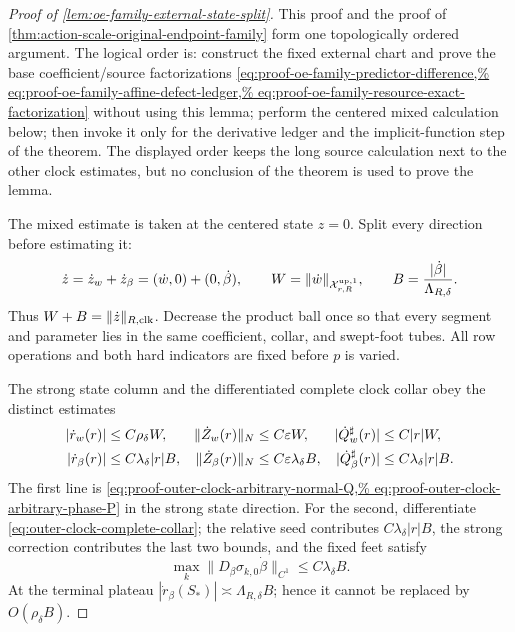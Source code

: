 \begin{proof}[Proof of
\cref{lem:oe-family-external-state-split}]
This proof and the proof of
\cref{thm:action-scale-original-endpoint-family} form one topologically
ordered argument.  The logical order is: construct the fixed external
chart and prove the base coefficient/source factorizations
\cref{eq:proof-oe-family-predictor-difference,%
eq:proof-oe-family-affine-defect-ledger,%
eq:proof-oe-family-resource-exact-factorization} without using this
lemma; perform the centered mixed calculation below; then invoke it only
for the derivative ledger and the implicit-function step of the theorem.
The displayed order keeps the long source calculation next to the other
clock estimates, but no conclusion of the theorem is used to prove the
lemma.

The mixed estimate is taken at the centered state \(z=0\).  Split every
direction before estimating it:
\begin{equation}
 \dot z=\dot z_w+\dot z_\beta=(\dot w,0)+(0,\dot\beta),
 \qquad
 W=\|\dot w\|_{\mathcal X_{r,R}^{\rm up,1}},
 \qquad
 B=\frac{|\dot\beta|}{\Lambda_{R,\delta}}.       \label{eq:proof-oe-family-direction-split}
\end{equation}
Thus \(W+B=\|\dot z\|_{R,\rm clk}\).  Decrease the product ball once so
that every segment and parameter lies in the same coefficient, collar,
and swept-foot tubes.  All row operations and both hard indicators are
fixed before \(p\) is varied.

The strong state column and the differentiated complete clock collar obey
the distinct estimates
\begin{align}
 |\dot r_w(r)|&\le C\rho_\delta W,&
 \|\dot Z_w(r)\|_N&\le C\varepsilon W,&
 |\dot Q_w^\sharp(r)|&\le C|r|W,\notag\\
 |\dot r_\beta(r)|&\le C\lambda_\delta|r|B,&
 \|\dot Z_\beta(r)\|_N&\le C\varepsilon\lambda_\delta B,&
 |\dot Q_\beta^\sharp(r)|&\le C\lambda_\delta|r|B.
                                                        \label{eq:proof-oe-family-state-clock-columns}
\end{align}
The first line is
\cref{eq:proof-outer-clock-arbitrary-normal-Q,%
eq:proof-outer-clock-arbitrary-phase-P} in the strong state direction.
For the second, differentiate
\cref{eq:outer-clock-complete-collar}; the relative seed contributes
\(C\lambda_\delta|r|B\), the strong correction contributes the last two
bounds, and the fixed feet satisfy
\begin{equation}
 \max_k\|D_\beta\sigma_{k,0}\dot\beta\|_{C^1}
 \le C\lambda_\delta B.                         \label{eq:proof-oe-family-clock-foot-column}
\end{equation}
At the terminal plateau
\(|\dot r_\beta(S_*)|\asymp\Lambda_{R,\delta}B\); hence it cannot be
replaced by \(O(\rho_\delta B)\).


\end{proof}
